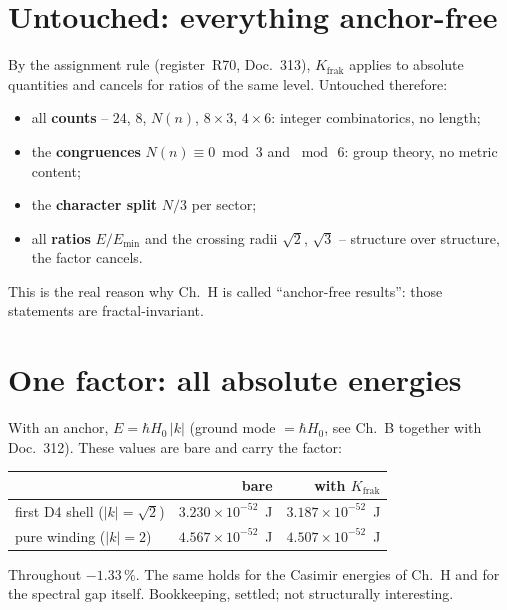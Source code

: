 \section{Untouched: everything anchor-free}

By the assignment rule (register~R70, Doc.~313), $K_\text{frak}$
applies to absolute quantities and cancels for ratios of the same
level. Untouched therefore:

\begin{itemize}
  \item all \textbf{counts} -- $24$, $8$, $N(n)$, $8\times3$,
        $4\times6$: integer combinatorics, no length;
  \item the \textbf{congruences} $N(n)\equiv0 \bmod 3$ and
        $\bmod\,6$: group theory, no metric content;
  \item the \textbf{character split} $N/3$ per sector;
  \item all \textbf{ratios} $E/E_\text{min}$ and the crossing radii
        $\sqrt2$, $\sqrt3$ -- structure over structure, the factor
        cancels.
\end{itemize}

\noindent This is the real reason why Ch.~H is called
\enquote{anchor-free results}: those statements are
fractal-invariant.

\section{One factor: all absolute energies}

With an anchor, $E = \hbar H_0\,|k|$ (ground mode $= \hbar H_0$, see
Ch.~B together with Doc.~312). These values are bare and carry the
factor:

\begin{center}
\begin{tabular}{lrr}
\toprule
 & bare & with $K_\text{frak}$ \\
\midrule
first D4 shell ($|k| = \sqrt2$) & $3.230\times10^{-52}$~J &
  $3.187\times10^{-52}$~J \\
pure winding ($|k| = 2$) & $4.567\times10^{-52}$~J &
  $4.507\times10^{-52}$~J \\
\bottomrule
\end{tabular}
\end{center}

\noindent Throughout $-1.33\,\%$. The same holds for the Casimir
energies of Ch.~H and for the spectral gap itself. Bookkeeping,
settled; not structurally interesting.

